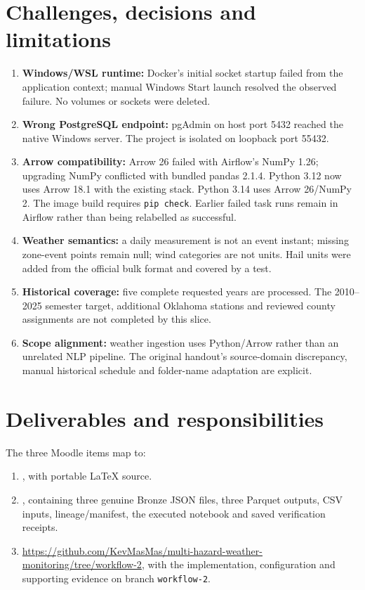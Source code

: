\documentclass[10pt]{article}
\begin{document}
\section{Challenges, decisions and limitations}
\begin{enumerate}
\item \textbf{Windows/WSL runtime:} Docker's initial socket startup failed from
the application context; manual Windows Start launch resolved the observed
failure. No volumes or sockets were deleted.
\item \textbf{Wrong PostgreSQL endpoint:} pgAdmin on host port 5432 reached the
native Windows server. The project is isolated on loopback port 55432.
\item \textbf{Arrow compatibility:} Arrow 26 failed with Airflow's NumPy 1.26;
upgrading NumPy conflicted with bundled pandas 2.1.4. Python 3.12 now uses
Arrow 18.1 with the existing stack. Python 3.14 uses Arrow 26/NumPy 2.
The image build requires \texttt{pip check}. Earlier failed task runs remain in
Airflow rather than being relabelled as successful.
\item \textbf{Weather semantics:} a daily measurement is not an event instant;
missing zone-event points remain null; wind categories are not units.
Hail units were added from the official bulk format and covered by a test.
\item \textbf{Historical coverage:} five complete requested years are processed.
The 2010--2025 semester target, additional Oklahoma stations and reviewed county
assignments are not completed by this slice.
\item \textbf{Scope alignment:} weather ingestion uses Python/Arrow rather than
an unrelated NLP pipeline. The original handout's source-domain discrepancy,
manual historical schedule and folder-name adaptation are explicit.
\end{enumerate}

\section{Deliverables and responsibilities}
The three Moodle items map to:
\begin{enumerate}
\item {}, with portable LaTeX source.
\item {}, containing three
genuine Bronze JSON files, three Parquet outputs, CSV inputs, lineage/manifest,
the executed notebook and saved verification receipts.
\item \url{https://github.com/KevMasMas/multi-hazard-weather-monitoring/tree/workflow-2},
with the implementation, configuration and supporting evidence on branch
\texttt{workflow-2}.
\end{enumerate}
\end{document}
